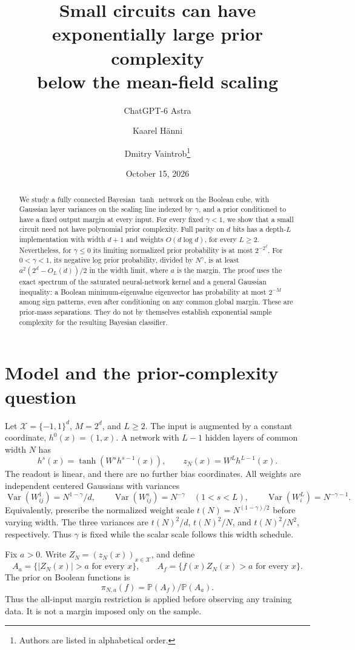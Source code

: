 \documentclass[11pt]{article}
\title{Small circuits can have exponentially large prior complexity\\below the mean-field scaling}
\author{ChatGPT-6 Astra \and Kaarel H\"anni \and Dmitry Vaintrob\thanks{Authors are listed in alphabetical order.}}
\date{October 15, 2026}
\theoremstyle{remark}
\DeclareMathOperator{\Var}{Var}
\newcommand{\Prb}{\mathbb P}
\begin{document}
\maketitle
\begin{abstract}
We study a fully connected Bayesian $\tanh$ network on the Boolean
cube, with Gaussian layer variances on the scaling line indexed by
$\gamma$, and a prior conditioned to have a fixed output margin at
every input. For every fixed $\gamma<1$, we show that a small circuit
need not have polynomial prior complexity. Full parity on $d$ bits
has a depth-$L$ implementation with width $d+1$ and weights
$O(d\log d)$, for every $L\ge2$. Nevertheless, for $\gamma\le0$ its
limiting normalized prior probability is at most $2^{-2^d}$. For
$0<\gamma<1$, its negative log prior probability, divided by
$N^\gamma$, is at least $a^2(2^d-O_L(d))/2$ in the width limit,
where $a$ is the margin. The proof uses the exact spectrum of the
saturated neural-network kernel and a general Gaussian inequality:
a Boolean minimum-eigenvalue eigenvector has probability at most
$2^{-M}$ among sign patterns, even after conditioning on any common
global margin. These are prior-mass separations. They do not by
themselves establish exponential sample complexity for the resulting
Bayesian classifier.
\end{abstract}

\section{Model and the prior-complexity question}

Let $\mathcal X=\{-1,1\}^d$, $M=2^d$, and $L\ge2$. The input is
augmented by a constant coordinate, $h^0(x)=(1,x)$. A network with
$L-1$ hidden layers of common width $N$ has
\[
 h^s(x)=\tanh(W^s h^{s-1}(x)),\qquad
 z_N(x)=W^L h^{L-1}(x).
\]
The readout is linear, and there are no further bias coordinates.
All weights are independent centered Gaussians with variances
\begin{equation}\label{eq:scaling}
 \Var(W^1_{ij})=N^{1-\gamma}/d,\qquad
 \Var(W^s_{ij})=N^{-\gamma}\quad(1<s<L),\qquad
 \Var(W^L_i)=N^{-\gamma-1}.
\end{equation}
Equivalently, prescribe the normalized weight scale
$t(N)=N^{(1-\gamma)/2}$ before varying width. The three variances are
$t(N)^2/d$, $t(N)^2/N$, and $t(N)^2/N^2$, respectively.
Thus $\gamma$ is fixed while the scalar scale follows this width schedule.

Fix $a>0$. Write $Z_N=(z_N(x))_{x\in\mathcal X}$, and define
\[
 A_a=\{|Z_N(x)|>a\text{ for every }x\},\qquad
 A_f=\{f(x)Z_N(x)>a\text{ for every }x\}.
\]
The prior on Boolean functions is
\begin{equation}\label{eq:prior}
 \pi_{N,a}(f)=\Prb(A_f)/\Prb(A_a).
\end{equation}
Thus the all-input margin restriction is applied before observing
any training data. It is not a margin imposed only on the sample.
\end{document}
